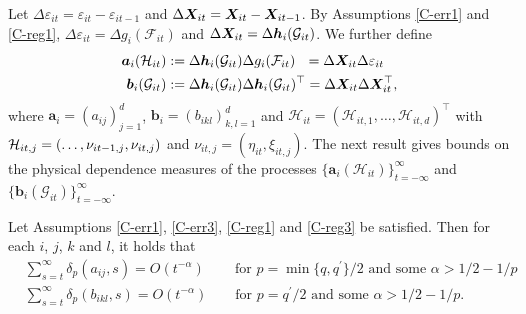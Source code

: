 \documentclass[12pt]{article}
\begin{document}
Let $\Delta \varepsilon_{it} = \varepsilon_{it} - \varepsilon_{it-1}$ and $\Delta \boldsymbol{X}_{it} = \boldsymbol{X}_{it} - \boldsymbol{X}_{it-1}$. By Assumptions \ref{C-err1} and \ref{C-reg1}, $\Delta \varepsilon_{it} = \Delta g_i(\mathcal{F}_{it})$ and $\Delta \boldsymbol{X}_{it} = \Delta \boldsymbol{h}_{i}(\mathcal{G}_{it})$. We further define
\begin{align*}
\boldsymbol{a}_{i}(\mathcal{H}_{it}) & := \Delta \boldsymbol{h}_{i}(\mathcal{G}_{it}) \Delta g_i(\mathcal{F}_{it})\phantom{^\top} = \Delta \boldsymbol{X}_{it} \Delta \varepsilon_{it} \\
\boldsymbol{b}_{i}(\mathcal{G}_{it}) & := \Delta \boldsymbol{h}_{i}(\mathcal{G}_{it}) \Delta \boldsymbol{h}_{i}(\mathcal{G}_{it})^\top = \Delta \boldsymbol{X}_{it} \Delta \boldsymbol{X}_{it}^\top,
\end{align*}
where $\boldsymbol{a}_i = (a_{ij})_{j=1}^d$, $\boldsymbol{b}_i = (b_{ikl})_{k,l=1}^d$ and $\mathcal{H}_{it} = (\mathcal{H}_{it,1},\ldots,\mathcal{H}_{it,d})^\top$ with $\mathcal{H}_{it,j} = (\ldots, \nu_{it-1,j},\linebreak \nu_{it,j})$ and $\nu_{it,j} = (\eta_{it},\xi_{it,j})$. The next result gives bounds on the physical dependence measures of the processes $\{ \boldsymbol{a}_{i}(\mathcal{H}_{it}) \}_{t=-\infty}^\infty$ and $\{ \boldsymbol{b}_{i}(\mathcal{G}_{it}) \}_{t=-\infty}^\infty$. 


\begin{lemmaA}\label{lemma-bounds-dep-measure}
Let Assumptions \ref{C-err1}, \ref{C-err3}, \ref{C-reg1} and \ref{C-reg3} be satisfied. Then for each $i$, $j$, $k$ and $l$, it holds that
\begin{align*}
 & \sum_{s=t}^\infty \delta_p(a_{ij}, s) = O(t^{-\alpha}) \, \qquad \text{for } p = \min\{q,q^\prime\}/2 \text{ and some } \alpha > 1/2 - 1/p \\
 & \sum_{s=t}^\infty \delta_p(b_{ikl}, s) = O(t^{-\alpha}) \qquad \text{for } p = q^\prime/2 \text{ and some } \alpha > 1/2 - 1/p.
\end{align*}
\end{lemmaA}
\end{document}
